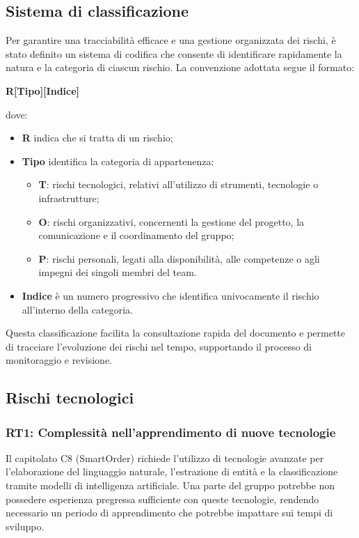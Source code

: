 \documentclass[a4paper, 11pt, oneside]{scrartcl} %
\begin{document}
\subsection{Sistema di classificazione}

Per garantire una tracciabilità efficace e una gestione organizzata dei rischi, è stato definito un sistema di codifica che consente di identificare rapidamente la natura e la categoria di ciascun rischio. La convenzione adottata segue il formato:

\begin{center}
\textbf{R[Tipo][Indice]}
\end{center}

dove:
\begin{itemize}
    \item \textbf{R} indica che si tratta di un rischio;
    \item \textbf{Tipo} identifica la categoria di appartenenza:
    \begin{itemize}
        \item \textbf{T}: rischi tecnologici, relativi all'utilizzo di strumenti, tecnologie o infrastrutture;
        \item \textbf{O}: rischi organizzativi, concernenti la gestione del progetto, la comunicazione e il coordinamento del gruppo;
        \item \textbf{P}: rischi personali, legati alla disponibilità, alle competenze o agli impegni dei singoli membri del team.
    \end{itemize}
    \item \textbf{Indice} è un numero progressivo che identifica univocamente il rischio all'interno della categoria.
\end{itemize}

Questa classificazione facilita la consultazione rapida del documento e permette di tracciare l'evoluzione dei rischi nel tempo, supportando il processo di monitoraggio e revisione.

\subsection{Rischi tecnologici}

\subsubsection{RT1: Complessità nell'apprendimento di nuove tecnologie}
\label{sec:rt1}

Il capitolato C8 (SmartOrder) richiede l'utilizzo di tecnologie avanzate per l'elaborazione del linguaggio naturale, l'estrazione di entità e la classificazione tramite modelli di intelligenza artificiale. Una parte del gruppo potrebbe non possedere esperienza pregressa sufficiente con queste tecnologie, rendendo necessario un periodo di apprendimento che potrebbe impattare sui tempi di sviluppo.
\end{document}
